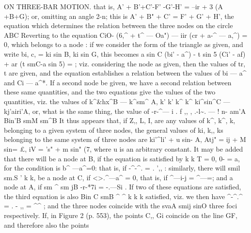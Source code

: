 \documentclass[11pt,a4paper]{book}
\begin{document}
ON THREE-BAR MOTION.
that
is, A' + B'+C'-F' -G'-H' = --ir + 3 (A +B+G);
or, omitting
an
angle
2-n;
this
is A' + B" + C' = F' + G' + H',
the
equation
which
determines
the
relation
between
the
three
nodes
on
the
circle ABC
Reverting
to
the
equation
CiO- (6,\textasciicircum{} + t\textasciicircum{} --- Oa") --- iir (cr + a-\textasciicircum{} --- a,\textasciicircum{}) = 0,
which
belongs
to
a
node
:
if we
consider
the
form
of
the
triangle
as
given,
and
write
bi,
c, = ki sin B,
ki sin G,
this becomes
a sin C (bi' - a\textasciicircum{}) - t sin 5 (Ci' - af) + ar (t smC-a sin 5) =
;
viz. considering
the
node
as
given, then the
values of
tr, t are
given, and the equation
establishes
a
relation
between
the
values
of
bi --- a\textasciicircum{}
and
Ci --- a\textasciicircum{}*.
If a
second
node
be
given, we
have
a
second
relation
between
these
same
quantities,
and
the
two
equations give
the
values
of
the
two
quantities,
viz.
the
values
of k\textasciicircum{}\&hx\textasciicircum{}B --- k\textasciicircum{}sm\textasciicircum{} A,
k'
k'
k\textasciicircum{}
k\textasciicircum{}
ki\textasciicircum{}sin\textasciicircum{}C --- kj'airi'A, or, what is the same thing, the value of
-r-\textasciicircum{}---
i
.
f ,, ,
.-l\textasciitilde{}. --- \textbullet{}
! n-
\textdegree{}
am'A
Bin'B
smM
sm\textasciicircum{}B
It
thus appears
that,
if
Z,, L,
I, are any values of k\textasciicircum{},
k\textasciicircum{},
k,
belonging
to
a given system
of
three nodes, the
general
values
of
ki,
k,,
ks belonging
to
the
same
system
of
three
nodes are
ki'\textasciicircum{}li' + u sin- A,
Atj" = ij\guillemotright{} + M sin= \pounds{},
iV = 's" + m sin" (7,
where u
is an arbitrary constant.
It may be
added
that
there
will
be
a node
at
B,
if
the
equation
is
satisfied by
k
k\guillemotleft{}
T = 0, 0- = a, for the condition
is b\textasciicircum{} ---a\textasciicircum{}=0: that
is, if -\textasciicircum{}-\textasciicircum{}. =
.
',,
: similarly, there
will
smil
sm.S
\textbullet{}'
k
k,
be
a
node
at
C,
if
<>.\textasciicircum{}---a\textasciicircum{} = 0,
that
is,
if
\textasciicircum{}---i-j =
\textasciicircum{}---=;
and
a
node
at
A,
if
sm \textasciicircum{}
sm jB
-r-*7i = -.---Si
.
If
two
of
these
equations
are
satisfied,
the
third
equation
is
also
Bin C
smB
\textasciicircum{}
\textasciicircum{}
k
k
k
satisfied,
viz. we
then
have
\textasciicircum{}-\textasciicircum{}.\textasciicircum{} =
. - ,, =
\textbullet{}
\textasciicircum{}\textasciicircum{}
;
and
the
three nodes coincide with the
svaA
smij
sinO
three
foci
respectively.
If,
in
Figure
2
(p.
553), the
points
C,, Gi coincide
on
the
line GF, and
therefore
also the points
\end{document}
